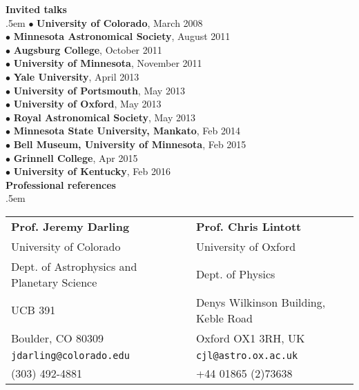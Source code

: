 {{{\medskip
\noindent
{\Large\bf Invited talks}\\[4pt]
\medskip
\parindent .5em
$\bullet$ {\bf University of Colorado}, March 2008 \\[2pt]
$\bullet$ {\bf Minnesota Astronomical Society}, August 2011 \\[2pt]
$\bullet$ {\bf Augsburg College}, October 2011 \\[2pt]
$\bullet$ {\bf University of Minnesota}, November 2011 \\[2pt]
$\bullet$ {\bf Yale University}, April 2013 \\[2pt]
$\bullet$ {\bf University of Portsmouth}, May 2013 \\[2pt]
$\bullet$ {\bf University of Oxford}, May 2013 \\[2pt]
$\bullet$ {\bf Royal Astronomical Society}, May 2013 \\[2pt]
$\bullet$ {\bf Minnesota State University, Mankato}, Feb 2014 \\[2pt]
$\bullet$ {\bf Bell Museum, University of Minnesota}, Feb 2015 \\[2pt]
$\bullet$ {\bf Grinnell College}, Apr 2015 \\[2pt]
$\bullet$ {\bf University of Kentucky}, Feb 2016 \\[2pt]

\parindent0in
\medskip
\medskip
\noindent
{\Large\bf Professional references}\\[4pt]
\medskip
\parindent .5em

\begin{tabular}{@{}p{3.5in}p{3.5in}}
{\large \bf Prof. Jeremy Darling}             &     {\large \bf Prof. Chris Lintott}        \\	       
University of Colorado                        &     University of Oxford                  \\      
Dept. of Astrophysics and Planetary Science   &     Dept. of Physics  	                  \\   
UCB 391		                                  &	    Denys Wilkinson Building, Keble Road  \\ 
Boulder, CO  80309                            &     Oxford OX1 3RH, UK                    \\
{\tt jdarling@colorado.edu}                   &     {\tt cjl@astro.ox.ac.uk}              \\
(303) 492-4881                                &     +44 01865 (2)73638                    \\[8pt]


\end{tabular}}}}
